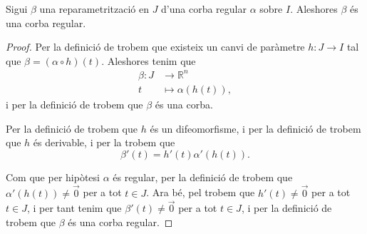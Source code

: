 \documentclass[../Apunts.tex]{subfiles}
\begin{document}
	\begin{proposition}
		Sigui \(\beta\) una reparametrització en \(J\) d'una corba regular \(\alpha\) sobre \(I\). Aleshores \(\beta\) és una corba regular.
		\begin{proof}
			Per la definició de  trobem que existeix un canvi de paràmetre \(h:J\longrightarrow I\) tal que \(\beta=(\alpha\circ h)(t)\). Aleshores tenim que
			\begin{align*}
				\beta\colon J&\longrightarrow\mathbb{R}^{n} \\
				t&\longmapsto\alpha(h(t)),
			\end{align*}
			i per la definició de  trobem que \(\beta\) és una corba.
			
			Per la definició de  trobem que \(h\) és un difeomorfisme, i per la definició de  trobem que \(h\) és derivable, i per la  trobem que
			\[\beta'(t)=h'(t)\alpha'(h(t)).\]
			
			Com que per hipòtesi \(\alpha\) és regular, per la definició de  trobem que \(\alpha'(h(t))\neq\vec{0}\) per a tot \(t\in J\). Ara bé, pel \corollari {} trobem que \(h'(t)\neq\vec{0}\) per a tot \(t\in J\), i per tant tenim que \(\beta'(t)\neq\vec{0}\) per a tot \(t\in J\), i per la definició de  trobem que \(\beta\) és una corba regular.
		\end{proof}
	\end{proposition}
\end{document}
